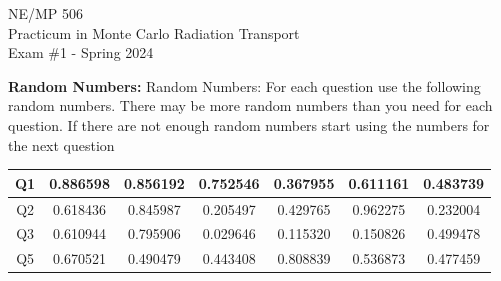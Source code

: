 \documentclass{article}
\begin{document}
\begin{centering}
  NE/MP 506\\
  Practicum in Monte Carlo Radiation Transport\\
  Exam \#1 - Spring 2024\\
\end{centering}

\vspace*{0.2in}

\textbf{Random Numbers:} Random Numbers: For each question use the following
random numbers.  There may be more random numbers than you need for each
question.  If there are not enough random numbers start using the numbers for
the next question

\begin{center}
\begin{tabular}{|c|c|c|c|c|c|c|}
  \hline
Q1 & 0.886598 & 0.856192 & 0.752546 & 0.367955 & 0.611161 & 0.483739\\ \hline

Q2 & 0.618436 & 0.845987 & 0.205497 & 0.429765 & 0.962275 & 0.232004 \\ \hline

Q3 & 0.610944 & 0.795906 & 0.029646 & 0.115320 & 0.150826 & 0.499478 \\ \hline

Q5 & 0.670521 & 0.490479 & 0.443408 & 0.808839 & 0.536873 & 0.477459 \\ \hline
\end{tabular}
\end{center}
\end{document}
